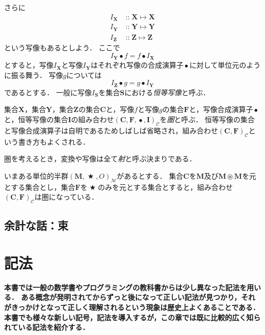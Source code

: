\documentclass[twocolumn]{jsbook}
\DeclareMathOperator{\mathAnyBinaryOperator}{\bigstar}
\DeclareMathOperator{\mathCompose}{\bullet}
\DeclareMathOperator{\mathIn}{::}
\DeclareMathOperator{\mathMapsTo}{\mapsto}
\DeclareMathOperator{\mathSetTimes}{\circledast}
\newcommand{\mathSet}[1]{\mathbf{#1}}
\newcommand{\mathCategoryShort}[2]{(#1,#2)_\mathcal{C}}
\newcommand{\mathMorph}[2]{#1\mathMapsTo#2}
\newcommand{\mathMonoid}[3]{(#1,#2,#3)_\mathcal{M}}
\newcommand{\mathCategory}[4]{(#1,#2,#3,#4)_\mathcal{C}}
\newcommand{\keyword}[1]{\emph{#1}}
\newenvironment{leader}{\begingroup\bf}{\endgroup}
\begin{document}
さらに
\begin{align*}
I_\mathSet{X}&\mathIn\mathMorph{\mathSet{X}}{\mathSet{X}}\\
I_\mathSet{Y}&\mathIn\mathMorph{\mathSet{Y}}{\mathSet{Y}}\\
I_\mathSet{Z}&\mathIn\mathMorph{\mathSet{Z}}{\mathSet{Z}}
\end{align*}
という写像もあるとしよう．
ここで$$I_\mathSet{Y}\mathCompose f=f\mathCompose I_\mathSet{X}$$とすると，写像$I_\mathSet{X}$と写像$I_\mathSet{Y}$はそれぞれ写像の合成演算子$\mathCompose$に対して単位元のように振る舞う．
写像$g$については$$I_\mathSet{Z}\mathCompose g=g\mathCompose I_\mathSet{Y}$$であるとする．
一般に写像$I_\mathSet{S}$を集合$\mathSet{S}$における\keyword{恒等写像}と呼ぶ．

集合$\mathSet{X}$，集合$\mathSet{Y}$，集合$\mathSet{Z}$の集合$\mathSet{C}$と，写像$f$と写像$g$の集合$\mathSet{F}$と，写像合成演算子$\mathCompose$と，恒等写像の集合$\mathSet{I}$の組み合わせ$\mathCategory{\mathSet{C}}{\mathSet{F}}{\mathCompose}{\mathSet{I}}$を\keyword{圏}と呼ぶ．
恒等写像の集合と写像合成演算子は自明であるためしばしば省略され，組み合わせ$\mathCategoryShort{\mathSet{C}}{\mathSet{F}}$という書き方もよくされる．

圏を考えるとき，変換や写像は全て\keyword{射}と呼ぶ決まりである．

いまある単位的半群$\mathMonoid{\mathSet{M}}{\mathAnyBinaryOperator}{O}$があるとする．
集合$\mathSet{C}$を$\mathSet{M}$及び$\mathSet{M}\mathSetTimes\mathSet{M}$を元とする集合とし，集合$\mathSet{F}$を$\mathAnyBinaryOperator$のみを元とする集合とすると，組み合わせ$\mathCategoryShort{\mathSet{C}}{\mathSet{F}}$は圏になっている．

\section*{余計な話：束}


\chapter{記法}

\begin{leader}
本書では一般の数学書やプログラミングの教科書からは少し異なった記法を用いる．
ある概念が発明されてからずっと後になって正しい記法が見つかり，それがきっかけとなって正しく理解されるという現象は歴史上よくあることである．
本書でも様々な新しい記号，記法を導入するが，この章では既に比較的広く知られている記法を紹介する．
\end{leader}
\end{document}
